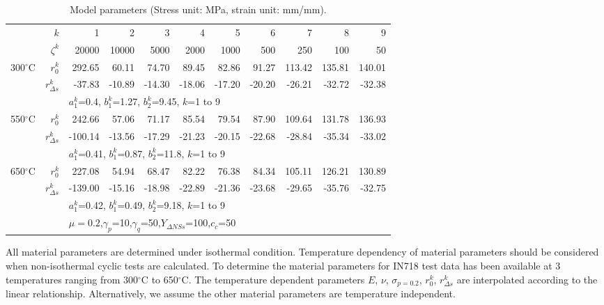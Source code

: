 \begin{table*}[htbp]
  \centering
  \caption{Model parameters (Stress unit: MPa, strain unit: mm/mm).}
    \begin{tabular}{rrrrrrrrrrr}
    \hline
          & $k$   & 1     & 2     & 3     & 4     & 5     & 6     & 7     & 8     & 9 \\
          & $\zeta^k$ & 20000 & 10000 & 5000  & 2000  & 1000  & 500   & 250   & 100   & 50 \\
    \hline
    300$^{\circ}$C & $r_0^k$ & 292.65  & 60.11  & 74.70  & 89.45  & 82.86  & 91.27  & 113.42  & 135.81  & 140.01  \\
          & $r_{\Delta s}^k$ & -37.83  & -10.89  & -14.30  & -18.06  & -17.20  & -20.20  & -26.21  & -32.72  & -32.38  \\
          & & \multicolumn{9}{l}{$a_1^k$=0.4, $b_1^k$=1.27, $b_2^k$=9.45, $k$=1 to 9} \\
    \hline
    550$^{\circ}$C & $r_0^k$ & 242.66  & 57.06  & 71.17  & 85.54  & 79.54  & 87.90  & 109.64  & 131.78  & 136.93  \\
          & $r_{\Delta s}^k$ & -100.14  & -13.56  & -17.29  & -21.23  & -20.15  & -22.68  & -28.84  & -35.34  & -33.02  \\
          & & \multicolumn{9}{l}{$a_1^k$=0.41, $b_1^k$=0.87, $b_2^k$=11.8, $k$=1 to 9} \\
    \hline
    650$^{\circ}$C & $r_0^k$ & 227.08  & 54.94  & 68.47  & 82.22  & 76.38  & 84.34  & 105.11  & 126.21  & 130.89  \\
          & $r_{\Delta s}^k$ & -139.00  & -15.16  & -18.98  & -22.89  & -21.36  & -23.68  & -29.65  & -35.76  & -32.75  \\
          & & \multicolumn{9}{l}{$a_1^k$=0.42, $b_1^k$=0.49, $b_2^k$=9.18, $k$=1 to 9} \\
    \hline
          & & \multicolumn{9}{l}{$\mu=0.2$,$\gamma_p$=10,$\gamma_q$=50,$Y_{\Delta NSs}$=100,$c_c$=50} \\
    \hline
    \end{tabular}%
  \label{Tab:ModelParameters}%
\end{table*}%

All material parameters are determined under isothermal condition.
Temperature dependency of material parameters should be considered when non-isothermal cyclic tests are calculated.
To determine the material parameters for IN718 test data has been available at 3 temperatures ranging from 300$^{\circ}$C to 650$^{\circ}$C.
The temperature dependent parameters $E$, $\nu$, $\sigma_{p=0.2}$, $r_0^k$, $r_{\Delta s}^k$ are interpolated according to the linear relationship.
Alternatively, we assume the other material parameters are temperature independent.


